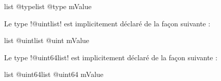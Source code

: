 \begin{galgas3box}
list @typelist {
  @type mValue
}
\end{galgas3box}






Le type \ggst!@uintlist! est implicitement déclaré de la façon suivante :

\begin{galgas3box}
list @uintlist {
  @uint mValue
}
\end{galgas3box}







Le type \ggst!@uint64list! est implicitement déclaré de la façon suivante :

\begin{galgas3box}
list @uint64list {
  @uint64 mValue
}
\end{galgas3box}

